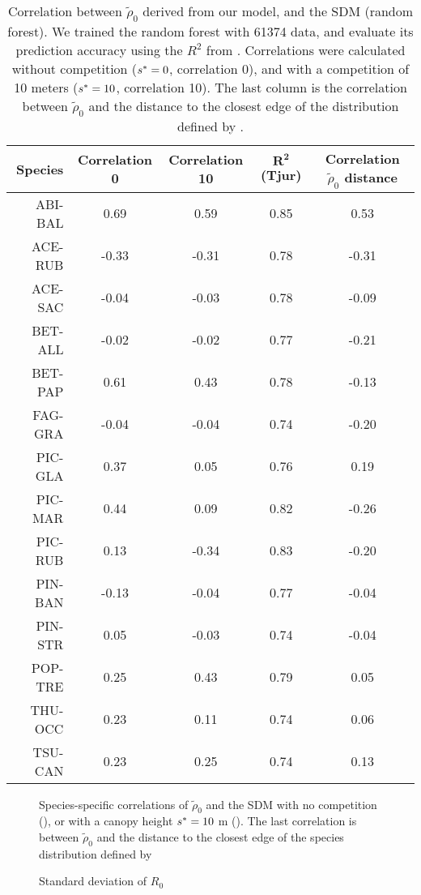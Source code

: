 \begin{table}[ht]
\centering
\caption{Correlation between $ \tilde \rho_0 $ derived from our model, and the SDM (random forest). We trained the random forest with \num{61374} data, and evaluate its prediction accuracy using the $ R^2 $ from \citet{Tjur2009}. Correlations were calculated without competition (\ie $ {s}^{*} = 0 $, correlation 0), and with a competition of 10 meters (\ie $ {s}^{*} = 10 $, correlation 10). The last column is the correlation between $ \tilde \rho_0 $ and the distance to the closest edge of the distribution defined by \citet{Little1971}. \label{tab::R0correlSDM}}
\begin{tabular}{@{}rcccc@{}}
	\toprule
	\textbf{Species} & \textbf{Correlation 0} & \textbf{Correlation 10} & $ \bm{R^2} $ \textbf{(Tjur)} & \textbf{Correlation $ \tilde \rho_0 $ distance} \\
	\midrule
		ABI-BAL & 0.69 & 0.59 & 0.85 & 0.53 \\
		ACE-RUB & -0.33 & -0.31 & 0.78 & -0.31 \\
		ACE-SAC & -0.04 & -0.03 & 0.78 & -0.09 \\
		BET-ALL & -0.02 & -0.02 & 0.77 & -0.21 \\
		BET-PAP & 0.61 & 0.43 & 0.78 & -0.13 \\
		FAG-GRA & -0.04 & -0.04 & 0.74 & -0.20 \\
		PIC-GLA & 0.37 & 0.05 & 0.76 & 0.19 \\
		PIC-MAR & 0.44 & 0.09 & 0.82 & -0.26 \\
		PIC-RUB & 0.13 & -0.34 & 0.83 & -0.20 \\
		PIN-BAN & -0.13 & -0.04 & 0.77 & -0.04 \\
		PIN-STR & 0.05 & -0.03 & 0.74 & -0.04 \\
		POP-TRE & 0.25 & 0.43 & 0.79 & 0.05 \\
		THU-OCC & 0.23 & 0.11 & 0.74 & 0.06 \\
		TSU-CAN & 0.23 & 0.25 & 0.74 & 0.13 \\
	\bottomrule
\end{tabular}
\end{table}

\begin{figure}
	\centering
	
	\caption{Species-specific correlations of $ \tilde \rho_0 $ and the SDM with no competition (\MoveUp), or with a canopy height $ {s}^{*} = 10 $ m (\CircSteel). The last correlation is between $ \tilde \rho_0 $ and the distance to the closest edge of the species distribution defined by \citet[\SquareSteel]{Little1971} \label{fig::3correls}}
\end{figure}

\begin{figure}
	\centering
	
	\caption{Standard deviation of $ R_0 $ \label{fig::uncertainty_map_acsa}}
\end{figure}
